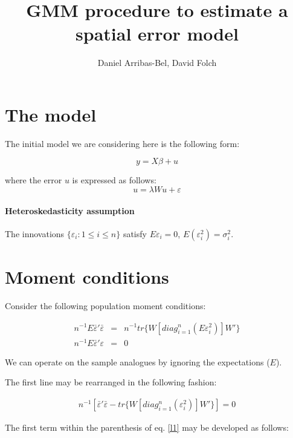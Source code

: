 \documentclass{article}
\title{GMM procedure to estimate a spatial error model}
\author{Daniel Arribas-Bel, David Folch}
\begin{document}
\maketitle
\section{The model}
The initial model we are considering here is the following form:

\begin{equation}
    y = X \beta + u
    \label{model1}
\end{equation}

where the error $u$ is expressed as follows:
\begin{equation}
    u = \lambda W u + \varepsilon
    \label{model2}
\end{equation}

\paragraph{Heteroskedasticity assumption}
The innovations $\{\varepsilon_i: 1 \leq i \leq n\}$ satisfy
$E\varepsilon_i=0$, $E(\varepsilon_i^2) = \sigma_i^2$.

\section{Moment conditions}
Consider the following population moment conditions:

\begin{eqnarray}
    n^{-1} E \bar{\varepsilon}' \bar{\varepsilon} & = & n^{-1}
    tr\{ W [diag_{i=1}^n (E\varepsilon_i^2)] W' \} \\
    n^{-1} E \bar{\varepsilon}' \varepsilon & = & 0 \nonumber
    \label{moments}
\end{eqnarray}

We can operate on the sample analogues by ignoring the expectations
($E$). 

The first line may be rearranged in the following fashion:

\begin{align}
n^{-1} \left[\bar\varepsilon'\bar\varepsilon - tr\{W[diag_{i=1}^n(\varepsilon_i^2)]W'\}\right] = 0
\label{l1}
\end{align}


The first term within the parenthesis of eq. \ref{l1} may be developed as
follows:
\end{document}
